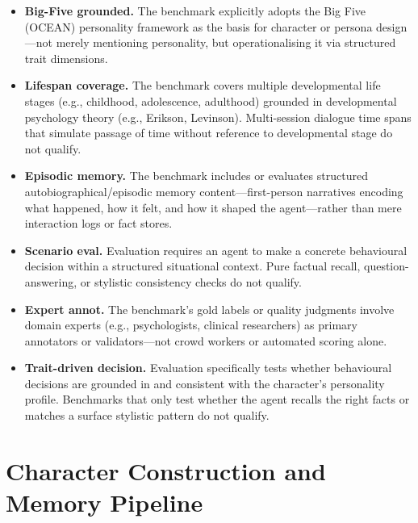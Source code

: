 \begin{itemize}[leftmargin=1.5em, itemsep=4pt]
  \item \textbf{Big-Five grounded.} The benchmark explicitly adopts the Big Five (OCEAN) personality framework as the basis for character or persona design---not merely mentioning personality, but operationalising it via structured trait dimensions.

  \item \textbf{Lifespan coverage.} The benchmark covers multiple developmental life stages (e.g., childhood, adolescence, adulthood) grounded in developmental psychology theory (e.g., Erikson, Levinson). Multi-session dialogue time spans that simulate passage of time without reference to developmental stage do not qualify.

  \item \textbf{Episodic memory.} The benchmark includes or evaluates structured autobiographical/episodic memory content---first-person narratives encoding what happened, how it felt, and how it shaped the agent---rather than mere interaction logs or fact stores.

  \item \textbf{Scenario eval.} Evaluation requires an agent to make a concrete behavioural decision within a structured situational context. Pure factual recall, question-answering, or stylistic consistency checks do not qualify.

  \item \textbf{Expert annot.} The benchmark's gold labels or quality judgments involve domain experts (e.g., psychologists, clinical researchers) as primary annotators or validators---not crowd workers or automated scoring alone.

  \item \textbf{Trait-driven decision.} Evaluation specifically tests whether behavioural decisions are grounded in and consistent with the character's personality profile. Benchmarks that only test whether the agent recalls the right facts or matches a surface stylistic pattern do not qualify.
\end{itemize}

\section{Character Construction and Memory Pipeline}
\label{app:character}

